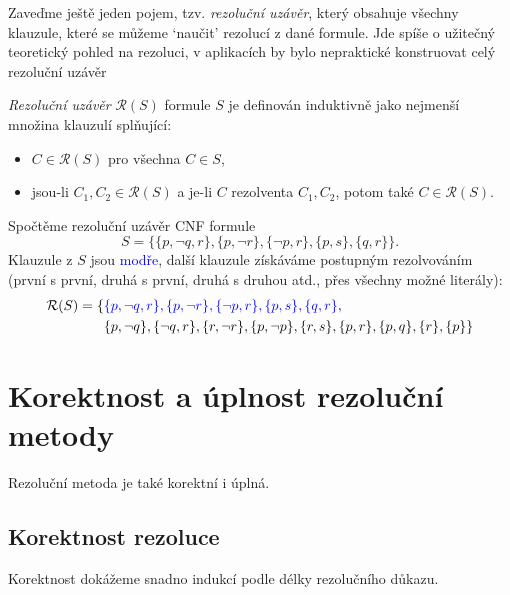 Zaveďme ještě jeden pojem, tzv. \emph{rezoluční uzávěr}, který obsahuje všechny klauzule, které se můžeme `naučit' rezolucí z dané formule. Jde spíše o užitečný teoretický pohled na rezoluci, v aplikacích by bylo nepraktické konstruovat celý rezoluční uzávěr

\begin{definition}
\emph{Rezoluční uzávěr} $\mathcal R(S)$ formule $S$ je definován induktivně jako nejmenší množina klauzulí splňující:
\begin{itemize}
    \item $C\in\mathcal R(S)$ pro všechna $C\in S$,
    \item jsou-li $C_1,C_2\in\mathcal R(S)$ a je-li $C$ rezolventa $C_1,C_2$, potom také $C\in\mathcal R(S)$.
\end{itemize}
\end{definition}

\begin{example}
    Spočtěme rezoluční uzávěr CNF formule 
    $$
    S=\{\{p,\neg q,r\},\{p,\neg r\},\{\neg p,r\},\{p,s\},\{q,r\}\}.
    $$ 
    Klauzule z $S$ jsou \textcolor{blue}{modře}, další klauzule získáváme postupným rezolvováním (první s první, druhá s první, druhá s druhou atd., přes všechny možné literály):
    \begin{align*}
        \mathcal R(S)=\{&\textcolor{blue}{\{p,\neg q,r\},\{p,\neg r\},\{\neg p,r\},\{p,s\},\{q,r\}},\\&\{p,\neg q\},\{\neg q,r\},\{r,\neg r\},\{p,\neg p\},\{r,s\},\{p,r\},\{p,q\},\{r\},\{p\}\}
    \end{align*}
\end{example}

\section{Korektnost a úplnost rezoluční metody}

Rezoluční metoda je také korektní i úplná. 

\subsection{Korektnost rezoluce}

Korektnost dokážeme snadno indukcí podle délky rezolučního důkazu.

